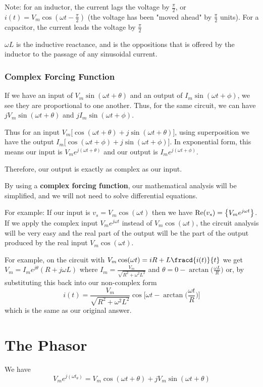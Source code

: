 \documentclass[12pt]{article}
\begin{document}
Note: for an inductor, the current lags the voltage by $\frac{\pi}{2}$, or $i(t) = V_m\cos(\omega t - \frac{\pi}{2})$ (the voltage has been "moved ahead" by $\frac{\pi}{2}$ units). For a capacitor, the current leads the voltage by $\frac{\pi}{2}$

$\omega L$ is the inductive reactance, and is the oppositions that is offered by the inductor to the passage of any sinusoidal current.

\subsubsection*{Complex Forcing Function}
If we have an input of $V_m\sin(\omega t + \theta)$ and an output of $I_m\sin(\omega t + \phi)$, we see they are proportional to one another. Thus, for the same circuit, we can have $jV_m\sin(\omega t + \theta)$ and $jI_m\sin(\omega t + \phi)$.

Thus for an input $V_m\bigl[\cos(\omega t + \theta) + j\sin(\omega t + \theta)\bigl]$, using superposition we have the output $I_m\bigl[\cos(\omega t + \phi) + j\sin(\omega t + \phi)\bigl]$. In exponential form, this means our input is $V_me^{j(\omega t + \theta)}$ and our output is $I_me^{j(\omega t + \phi)}$.

Therefore, our output is exactly as complex as our input.

By using a {\bf complex forcing function}, our mathematical analysis will be simplified, and we will not need to solve differential equations.

For example: If our input is $v_s = V_m\cos(\omega t)$ then we have ${\rm Re}(v_s) = \bigl\{V_me^{j\omega t}\bigl\}$. If we apply the complex input $V_me^{j\omega t}$ instead of $V_m\cos(\omega t)$, the circuit analysis will be very easy and the real part of the output will be the part of the output produced by the real input $V_m\cos(\omega t)$.

For example, on the circuit with $V_m \cos(\omega t) = iR + L\fracd{i(t)}{t}$ we get $V_m = I_m e^{j\theta}(R + j\omega L)$ where $I_m = \frac{V_m}{\sqrt{R^2 + \omega^2L^2}}$ and $\theta = 0 - \arctan\bigl(\frac{\omega L}{R}\bigl)$ or, by substituting this back into our non-complex form \[ i(t) = \frac{V_m}{\sqrt{R^2 + \omega^2L^2}}\cos\bigg[\omega t - \arctan\bigl(\frac{\omega t}{R}\bigl)\bigg] \] which is the same as our original answer.

\section*{The Phasor}
We have \[ V_me^{j(\omega t _ \theta)} = V_m\cos(\omega t + \theta) + jV_m\sin(\omega t + \theta) \]
\end{document}
